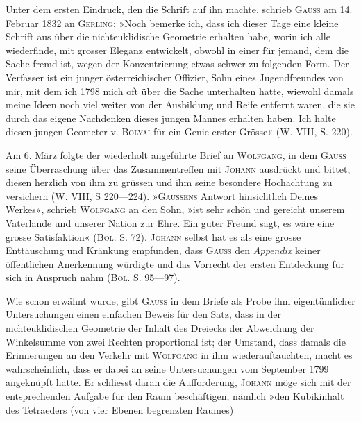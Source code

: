 \par
Unter dem ersten Eindruck, den die Schrift auf ihn machte, schrieb \textsc{Gauss}
am 14. Februar 1832 an \textsc{Gerling}: »Noch bemerke ich, dass ich dieser Tage
eine kleine Schrift aus  über die nichteuklidische Geometrie erhalten
habe, worin ich alle  wiederfinde,
mit grosser Eleganz entwickelt, obwohl in einer für jemand, dem die Sache
fremd ist, wegen der Konzentrierung etwas schwer zu folgenden Form. Der
Verfasser ist ein  junger österreichischer Offizier, Sohn eines Jugendfreundes
von mir, mit dem ich 1798 mich oft über die Sache unterhalten
hatte, wiewohl damals meine Ideen noch viel weiter von der Ausbildung und
Reife entfernt waren, die sie durch das eigene Nachdenken dieses jungen
Mannes erhalten haben. Ich halte diesen jungen Geometer v. \textsc{Bolyai} für ein
Genie erster Grösse« (W. VIII, S. 220).
\par
Am 6. März folgte der wiederholt angeführte Brief an \textsc{Wolfgang}, in dem
\textsc{Gauss} seine Überraschung über das Zusammentreffen mit \textsc{Johann} ausdrückt
und bittet, diesen herzlich von ihm zu grüssen und ihm seine besondere Hochachtung
zu versichern (W. VIII, S 220—224). »\textsc{Gaussens} Antwort hinsichtlich
Deines Werkes«, schrieb \textsc{Wolfgang} an den Sohn, »ist sehr schön und gereicht
unserem Vaterlande und unserer Nation zur Ehre. Ein guter Freund sagt,
\clearpage{}\setcounter{footnote}{0}
\noindent es wäre eine grosse Satisfaktion« (\textsc{Bol.} S. 72). \textsc{Johann} selbst hat es als eine
grosse Enttäuschung und Kränkung empfunden, dass \textsc{Gauss} den \textit{Appendix}
keiner öffentlichen Anerkennung würdigte und das Vorrecht der ersten Entdeckung
für sich in Anspruch nahm (\textsc{Bol.} S. 95—97).
\par
Wie schon erwähnt wurde, gibt \textsc{Gauss} in dem Briefe als Probe ihm
eigentümlicher Untersuchungen einen einfachen Beweis für den Satz, dass in
der nichteuklidischen Geometrie der Inhalt des Dreiecks der Abweichung der
Winkelsumme von zwei Rechten proportional ist; der Umstand, dass damals
die Erinnerungen an den Verkehr mit \textsc{Wolfgang} in ihm wiederauftauchten,
macht es wahrscheinlich, dass er dabei an seine Untersuchungen vom September
1799 angeknüpft hatte. Er schliesst daran die Aufforderung, \textsc{Johann}
möge sich mit der entsprechenden Aufgabe für den Raum beschäftigen, nämlich
»den Kubikinhalt des Tetraeders (von vier Ebenen begrenzten Raumes)
